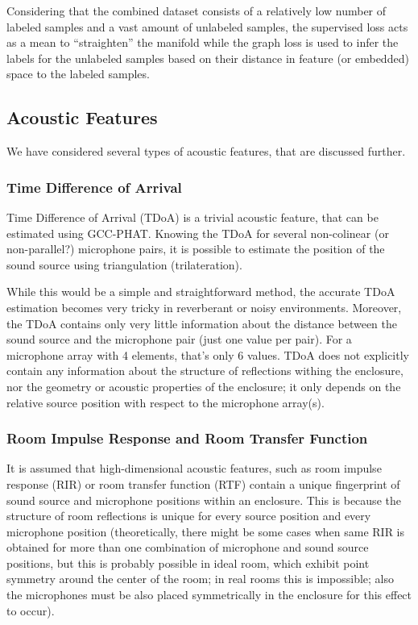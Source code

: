 \documentclass[applsci,article,submit,moreauthors,pdftex]{Definitions/mdpi}
\begin{document}
Considering that the combined dataset consists of a relatively low number of labeled samples and a vast amount of unlabeled samples, the supervised loss acts as a mean to ``straighten'' the manifold while the graph loss is used to infer the labels for the unlabeled samples based on their distance in feature (or embedded) space to the labeled samples.


\subsection{Acoustic Features}
We have considered several types of acoustic features, that are discussed further.

\subsubsection{Time Difference of Arrival}
Time Difference of Arrival (TDoA) is a trivial acoustic feature, that can be estimated using GCC-PHAT. Knowing the TDoA for several non-colinear (or non-parallel?) microphone pairs, it is possible to estimate the position of the sound source using triangulation (trilateration).

While this would be a simple and straightforward method, the accurate TDoA estimation becomes very tricky in reverberant or noisy environments. Moreover, the TDoA contains only very little information about the distance between the sound source and the microphone pair (just one value per pair). For a microphone array with 4 elements, that's only 6 values. TDoA does not explicitly contain any information about the structure of reflections withing the enclosure, nor the geometry or acoustic properties of the enclosure; it only depends on the relative source position with respect to the microphone array(s).

\subsubsection{Room Impulse Response and Room Transfer Function}
It is assumed that high-dimensional acoustic features, such as room impulse response (RIR) or room transfer function (RTF) contain a unique fingerprint of sound source and microphone positions within an enclosure. This is because the structure of room reflections is unique for every source position and every microphone position (theoretically, there might be some cases when same RIR is obtained for more than one combination of microphone and sound source positions, but this is probably possible in ideal room, which exhibit point symmetry around the center of the room; in real rooms this is impossible; also the microphones must be also placed symmetrically in the enclosure for this effect to occur).
\end{document}
